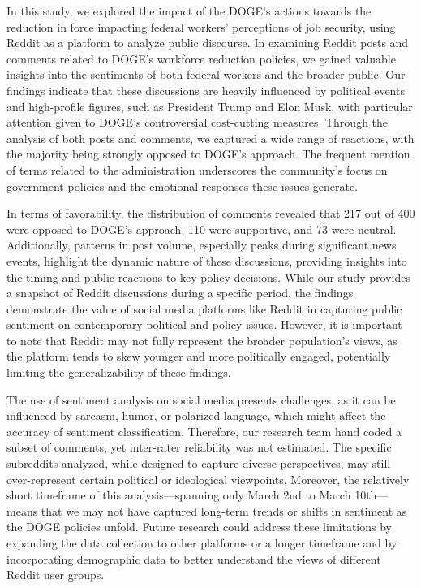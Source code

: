 \documentclass[
  12pt]{article}
\begin{document}
In this study, we explored the impact of the DOGE's actions towards the
reduction in force impacting federal workers' perceptions of job
security, using Reddit as a platform to analyze public discourse. In
examining Reddit posts and comments related to DOGE's workforce
reduction policies, we gained valuable insights into the sentiments of
both federal workers and the broader public. Our findings indicate that
these discussions are heavily influenced by political events and
high-profile figures, such as President Trump and Elon Musk, with
particular attention given to DOGE's controversial cost-cutting
measures. Through the analysis of both posts and comments, we captured a
wide range of reactions, with the majority being strongly opposed to
DOGE's approach. The frequent mention of terms related to the
administration underscores the community's focus on government policies
and the emotional responses these issues generate.

In terms of favorability, the distribution of comments revealed that 217
out of 400 were opposed to DOGE's approach, 110 were supportive, and 73
were neutral. Additionally, patterns in post volume, especially peaks
during significant news events, highlight the dynamic nature of these
discussions, providing insights into the timing and public reactions to
key policy decisions. While our study provides a snapshot of Reddit
discussions during a specific period, the findings demonstrate the value
of social media platforms like Reddit in capturing public sentiment on
contemporary political and policy issues. However, it is important to
note that Reddit may not fully represent the broader population's views,
as the platform tends to skew younger and more politically engaged,
potentially limiting the generalizability of these findings.

The use of sentiment analysis on social media presents challenges, as it
can be influenced by sarcasm, humor, or polarized language, which might
affect the accuracy of sentiment classification. Therefore, our research
team hand coded a subset of comments, yet inter-rater reliability was
not estimated. The specific subreddits analyzed, while designed to
capture diverse perspectives, may still over-represent certain political
or ideological viewpoints. Moreover, the relatively short timeframe of
this analysis---spanning only March 2nd to March 10th---means that we
may not have captured long-term trends or shifts in sentiment as the
DOGE policies unfold. Future research could address these limitations by
expanding the data collection to other platforms or a longer timeframe
and by incorporating demographic data to better understand the views of
different Reddit user groups.
\end{document}
